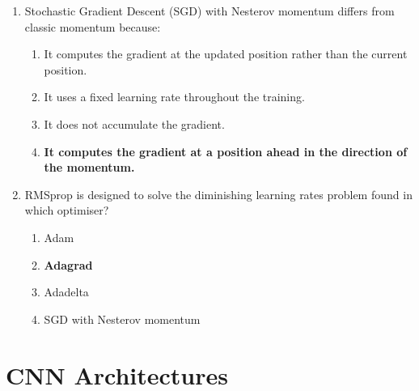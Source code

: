 \documentclass{report}
\numberwithin{equation}{section}
\begin{document}
\begin{enumerate}
\item Stochastic Gradient Descent (SGD) with Nesterov momentum differs from classic momentum because:
\begin{enumerate}[label=\alph*.]
    \item It computes the gradient at the updated position rather than the current position.
    \item It uses a fixed learning rate throughout the training.
    \item It does not accumulate the gradient.
    \item \textbf{It computes the gradient at a position ahead in the direction of the momentum.}
\end{enumerate}

\item RMSprop is designed to solve the diminishing learning rates problem found in which optimiser?
\begin{enumerate}[label=\alph*.]
    \item Adam
    \item \textbf{Adagrad}
    \item Adadelta
    \item SGD with Nesterov momentum
\end{enumerate}
\end{enumerate}


\section{CNN Architectures}
\end{document}
